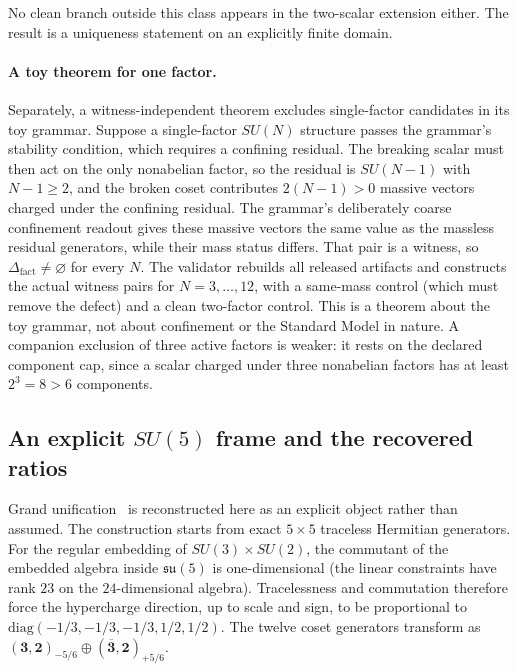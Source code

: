 \documentclass[11pt]{article}
\newcommand{\Deltafact}{\Delta_{\mathrm{fact}}}
\theoremstyle{definition}
\begin{document}
No clean branch outside this class appears in the two-scalar extension either. The result is a uniqueness statement
on an explicitly finite domain.

\paragraph{A toy theorem for one factor.} Separately, a witness-independent theorem excludes single-factor
candidates in its toy grammar. Suppose a single-factor \(SU(N)\) structure passes the grammar's stability condition,
which requires a confining residual. The breaking scalar must then act on the only nonabelian factor, so the residual is
\(SU(N-1)\) with \(N-1\ge2\), and the broken coset contributes \(2(N-1)>0\) massive vectors charged under the
confining residual. The grammar's deliberately coarse confinement readout gives these massive vectors the same value
as the massless residual generators, while their mass status differs. That pair is a witness, so
\(\Deltafact\neq\varnothing\) for every \(N\). The validator rebuilds all released artifacts and constructs the actual
witness pairs for \(N=3,\dots,12\), with a same-mass control (which must remove the defect) and a clean two-factor
control. This is a theorem about the toy grammar, not about confinement or the Standard Model in nature. A companion
exclusion of three active factors is weaker: it rests on the declared component cap, since a scalar charged under three
nonabelian factors has at least \(2^3=8>6\) components.

\subsection{An explicit \texorpdfstring{\(SU(5)\)}{SU(5)} frame and the recovered ratios}\label{the-xy-coset-spine-and-the-recovered-unification-ratios}

Grand unification~\citep{GeorgiGlashow1974} is reconstructed here as an explicit object rather than assumed. The
construction starts from exact \(5\times5\) traceless Hermitian generators. For the regular embedding of
\(SU(3)\times SU(2)\), the commutant of the embedded algebra inside \(\mathfrak{su}(5)\) is one-dimensional (the
linear constraints have rank \(23\) on the \(24\)-dimensional algebra). Tracelessness and commutation therefore force
the hypercharge direction, up to scale and sign, to be proportional to \(\mathrm{diag}(-1/3,-1/3,-1/3,1/2,1/2)\). The
twelve coset generators transform as \((\mathbf3,\mathbf2)_{-5/6}\oplus(\overline{\mathbf3},\mathbf2)_{+5/6}\).
\end{document}
